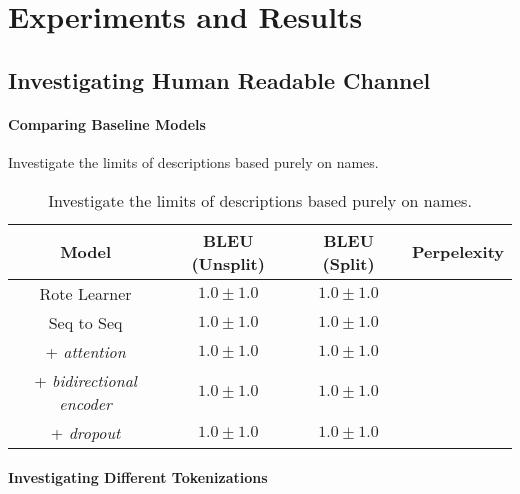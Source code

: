 \chapter{Experiments and Results}
\label{experiments_and_results}

\section{Investigating Human Readable Channel} %
\label{sec:investigating_human_readable_channel}


\subsubsection{Comparing Baseline Models} %
\label{ssub:comparing_baseline_models}

Investigate the limits of descriptions based purely on names.

\begin{table}[h!]
\begin{center}
\begin{tabular}{ c | c | c | c }
    Model                             & BLEU (Unsplit)  & BLEU (Split)    & Perpelexity \\
    \hline
    Rote Learner                      & $1.0 \pm 1.0 $  & $1.0 \pm 1.0 $  & \\
    \hline
    Seq to Seq                        & $1.0 \pm 1.0 $  & $1.0 \pm 1.0 $  &  \\
    + \textit{attention}              & $1.0 \pm 1.0 $  & $1.0 \pm 1.0 $  & \\
    + \textit{bidirectional encoder}  & $1.0 \pm 1.0 $  & $1.0 \pm 1.0 $  & \\
    + \textit{dropout}                & $1.0 \pm 1.0 $  & $1.0 \pm 1.0 $  & \\
    \hline
\end{tabular}
\caption {Investigate the limits of descriptions based purely on names.}
\label{table:name_baseline}
\end{center}
\end{table}




\subsubsection{Investigating Different Tokenizations} %
\label{ssub:investigating_different_tokenizations}

